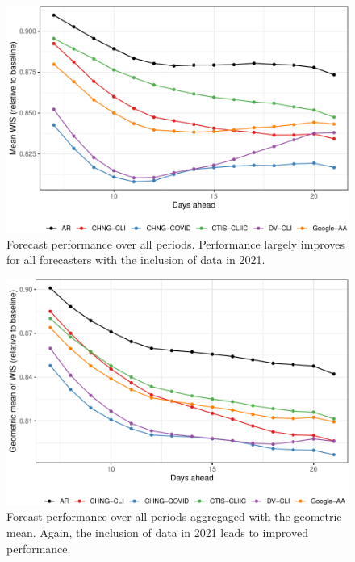 \documentclass[9pt,twoside,lineno]{pnas-new}
\begin{document}
\clearpage

\begin{figure}

{\centering \includegraphics[width=\textwidth]{fig/fcast-alldates-1} 

}

\caption{Forecast performance over all periods. Performance largely improves for all forecasters with the inclusion of data in 2021.}\label{fig:fcast-alldates}
\end{figure}

\clearpage

\begin{figure}

{\centering \includegraphics[width=\textwidth]{fig/fcast-alldates-adjusted-1} 

}

\caption{Forcast performance over all periods aggregaged with the geometric mean. Again, the inclusion of data in 2021 leads to improved performance.}\label{fig:fcast-alldates-adjusted}
\end{figure}
\end{document}

